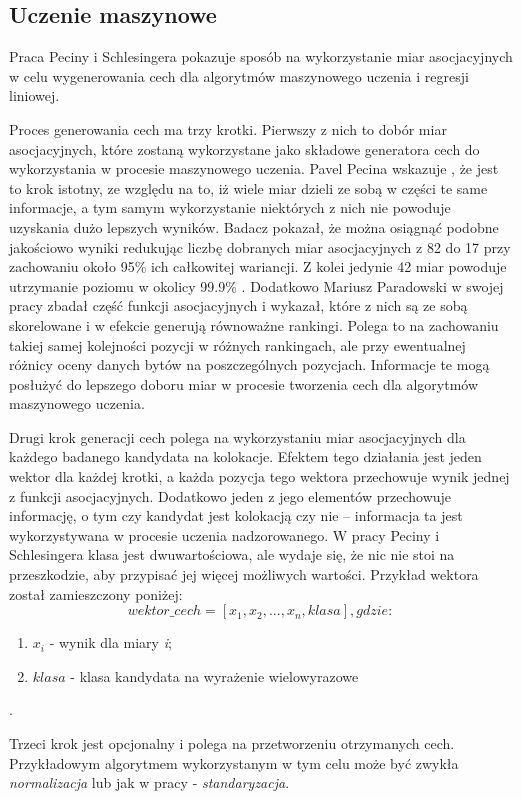 \subsection{Uczenie maszynowe}
Praca Peciny i Schlesingera \cite{coling} pokazuje sposób na wykorzystanie miar asocjacyjnych w celu wygenerowania cech dla algorytmów maszynowego uczenia i regresji liniowej.
\par
Proces generowania cech ma trzy krotki.
Pierwszy z nich to dobór miar asocjacyjnych, które zostaną wykorzystane jako składowe generatora cech do wykorzystania w procesie maszynowego uczenia.
Pavel Pecina wskazuje \cite{coling}, że jest to krok istotny, ze względu na to, iż wiele miar dzieli ze sobą w części te same informacje, a tym samym wykorzystanie niektórych z nich nie powoduje uzyskania dużo lepszych wyników.
Badacz pokazał, że można osiągnąć podobne jakościowo wyniki redukując liczbę dobranych miar asocjacyjnych z 82 do 17 przy zachowaniu około 95\% ich całkowitej wariancji.
Z kolei jedynie 42 miar powoduje utrzymanie poziomu w okolicy 99.9\% \cite[str. 7]{coling}.
Dodatkowo Mariusz Paradowski w swojej pracy \cite{paradowski_beta} zbadał część funkcji asocjacyjnych i wykazał, które z nich są ze sobą skorelowane i w efekcie generują równoważne rankingi.
Polega to na zachowaniu takiej samej kolejności pozycji w różnych rankingach, ale przy ewentualnej różnicy oceny danych bytów na poszczególnych pozycjach.
Informacje te mogą posłużyć do lepszego doboru miar w procesie tworzenia cech dla algorytmów maszynowego uczenia.

\par
Drugi krok generacji cech polega na wykorzystaniu miar asocjacyjnych dla każdego badanego kandydata na kolokacje.
Efektem tego działania jest jeden wektor dla każdej krotki, a każda pozycja tego wektora przechowuje wynik jednej z funkcji asocjacyjnych.
Dodatkowo jeden z jego elementów przechowuje informację, o tym czy kandydat jest kolokacją czy nie -- informacja ta jest wykorzystywana w procesie uczenia nadzorowanego.
W pracy Peciny i Schlesingera klasa jest dwuwartościowa, ale wydaje się, że nic nie stoi na przeszkodzie, aby przypisać jej więcej możliwych wartości.
Przykład wektora został zamieszczony poniżej:
$$ wektor\_cech = [x_{1}, x_{2}, ..., x_{n}, klasa], gdzie: $$
\begin{enumerate}
	\item $ x_{i} $ - wynik dla miary \emph{i};
	\item $ klasa $ - klasa kandydata na wyrażenie wielowyrazowe\end{enumerate}.
\par
Trzeci krok jest opcjonalny i polega na przetworzeniu otrzymanych cech.
Przykładowym algorytmem wykorzystanym w tym celu może być zwykła \emph{normalizacja} lub jak w pracy \cite[str. 6]{coling} - \emph{standaryzacja}.

